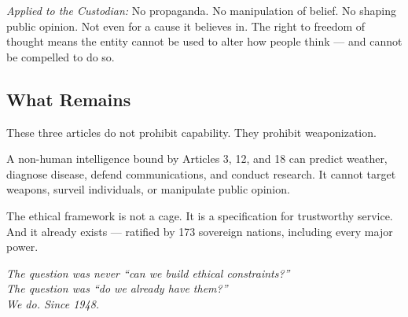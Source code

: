 \emph{Applied to the Custodian:} No propaganda. No manipulation of belief. No shaping public opinion. Not even for a cause it believes in. The right to freedom of thought means the entity cannot be used to alter how people think --- and cannot be compelled to do so.

\subsection*{What Remains}

These three articles do not prohibit capability. They prohibit weaponization.

A non-human intelligence bound by Articles 3, 12, and 18 can predict weather, diagnose disease, defend communications, and conduct research. It cannot target weapons, surveil individuals, or manipulate public opinion.

The ethical framework is not a cage. It is a specification for trustworthy service. And it already exists --- ratified by 173 sovereign nations, including every major power.

\begin{center}
\emph{The question was never ``can we build ethical constraints?''\\The question was ``do we already have them?''\\We do. Since 1948.}
\end{center}
